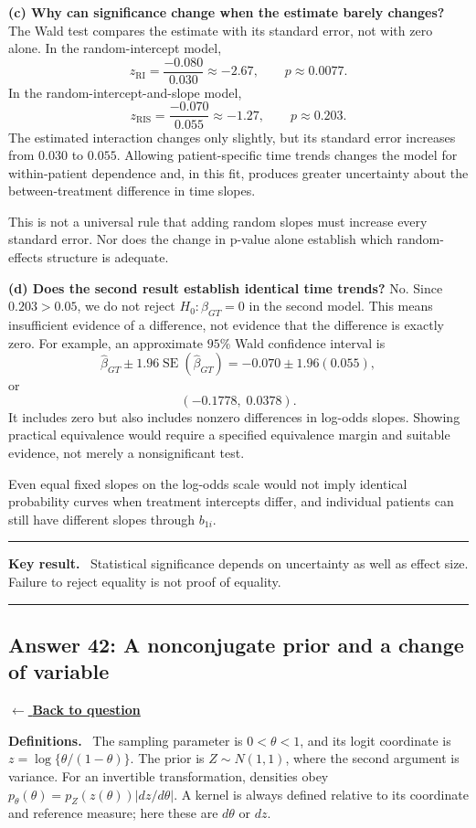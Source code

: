\documentclass[11pt,a4paper]{article}
\newcommand{\answernav}[1]{%
  \label{answer:#1}%
  \noindent\hyperref[question:#1]{$\leftarrow$ \textbf{Back to question}}%
  \par\smallskip}
\newcommand{\studyheading}[1]{%
  \par\medskip\noindent\textcolor{statblue}{\textbf{#1.}}\ }
\newenvironment{keyresult}
  {\begin{center}\begin{minipage}{0.92\linewidth}\color{statblue}%
   \hrule\vspace{6pt}\textbf{Key result.}\ }
  {\vspace{6pt}\hrule\end{minipage}\end{center}}
\begin{document}
\textbf{(c) Why can significance change when the estimate barely changes?}
The Wald test compares the estimate with its standard error, not with
zero alone. In the random-intercept model,
\[
z_{\mathrm{RI}}=\frac{-0.080}{0.030}\approx-2.67,
\qquad p\approx0.0077.
\]
In the random-intercept-and-slope model,
\[
z_{\mathrm{RIS}}=\frac{-0.070}{0.055}\approx-1.27,
\qquad p\approx0.203.
\]
The estimated interaction changes only slightly, but its standard error
increases from $0.030$ to $0.055$. Allowing patient-specific time trends
changes the model for within-patient dependence and, in this fit, produces
greater uncertainty about the between-treatment difference in time slopes.

This is not a universal rule that adding random slopes must increase
every standard error. Nor does the change in p-value alone establish
which random-effects structure is adequate.

\textbf{(d) Does the second result establish identical time trends?}
No. Since $0.203>0.05$, we do not reject
$H_0:\beta_{GT}=0$ in the second model. This means insufficient evidence
of a difference, not evidence that the difference is exactly zero.
For example, an approximate $95\%$ Wald confidence interval is
\[
\widehat\beta_{GT}\pm1.96\operatorname{SE}(\widehat\beta_{GT})
=-0.070\pm1.96(0.055),
\]
or
\[
\boxed{(-0.1778,\;0.0378).}
\]
It includes zero but also includes nonzero differences in log-odds slopes.
Showing practical equivalence would require a specified equivalence
margin and suitable evidence, not merely a nonsignificant test.

Even equal fixed slopes on the log-odds scale would not imply identical
probability curves when treatment intercepts differ, and individual
patients can still have different slopes through $b_{1i}$.

\begin{keyresult}
Statistical significance depends on uncertainty as well as effect size.
Failure to reject equality is not proof of equality.
\end{keyresult}

\clearpage

\subsection{Answer 42: A nonconjugate prior and a change of variable}
\answernav{42}

\studyheading{Definitions}
The sampling parameter is $0<\theta<1$, and its logit coordinate is $z=\log\{\theta/(1-\theta)\}$.
The prior is $Z\sim N(1,1)$, where the second argument is variance.
For an invertible transformation, densities obey
$p_\theta(\theta)=p_Z(z(\theta))|dz/d\theta|$.
A kernel is always defined relative to its coordinate and reference measure; here these are $d\theta$ or $dz$.
\end{document}

